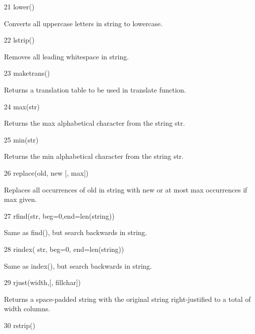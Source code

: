 21 \hspace*{0.5in} lower() \par
\vspace{12pt}
Converts all uppercase letters in string to lowercase. \par
22 \hspace*{0.5in} lstrip() \par
\vspace{12pt}
Removes all leading whitespace in string. \par
23 \hspace*{0.5in} maketrans() \par
\vspace{12pt}
Returns a translation table to be used in translate function. \par
24 \hspace*{0.5in} max(str) \par
\vspace{12pt}
Returns the max alphabetical character from the string str. \par
25 \hspace*{0.5in} min(str) \par
\vspace{12pt}
Returns the min alphabetical character from the string str. \par
26 \hspace*{0.5in} replace(old, new [, max]) \par
\vspace{12pt}
Replaces all occurrences of old in string with new or at most max occurrences if max given. \par
27 \hspace*{0.5in} rfind(str, beg=0,end=len(string)) \par
\vspace{12pt}
Same as find(), but search backwards in string. \par
28 \hspace*{0.5in} rindex( str, beg=0, end=len(string)) \par
\vspace{12pt}
Same as index(), but search backwards in string. \par
29 \hspace*{0.5in} rjust(width,[, fillchar]) \par
\vspace{12pt}
Returns a space-padded string with the original string right-justified to a total of width columns. \par
30 \hspace*{0.5in} rstrip() \par
